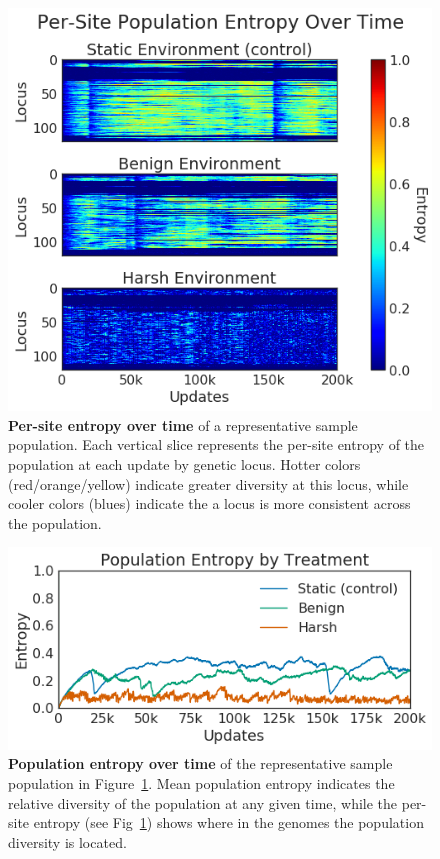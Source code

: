 \documentclass[10pt,letterpaper]{article}
\begin{document}
	\begin{figure}[!h]
	\includegraphics[width=0.75\columnwidth]{figures/CE/by_site_entropy}
	\caption{\textbf{Per-site entropy over time} of a representative sample population. Each vertical slice represents the per-site entropy of the population at each update by genetic locus. Hotter colors (red/orange/yellow) indicate greater diversity at this locus, while cooler colors (blues) indicate the a locus is more consistent across the population.   %
	}\label{fig:by-site-entropy}
	\end{figure}

	\begin{figure}[!h]
	\includegraphics[width=0.75\columnwidth]{figures/CE/population_entropy}
	\caption{\textbf{Population entropy over time} of the representative sample population in Figure~\ref{fig:by-site-entropy}. Mean population entropy indicates the relative diversity of the population at any given time, while the per-site entropy (see Fig~\ref{fig:by-site-entropy}) shows where in the genomes the population diversity is located.   %
	}\label{fig:population-entropy}
	\end{figure}
\end{document}
